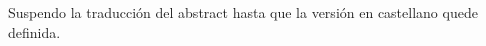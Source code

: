 \documentclass[
11pt, %
spanish, %
singlespacing, %
toctotoc, %
headsepline, %
]{MastersDoctoralThesis} %
\begin{document}
\begin{extraAbstract}

    Suspendo la traducción del abstract hasta que la versión en castellano quede definida.


\end{extraAbstract}




\end{document}
